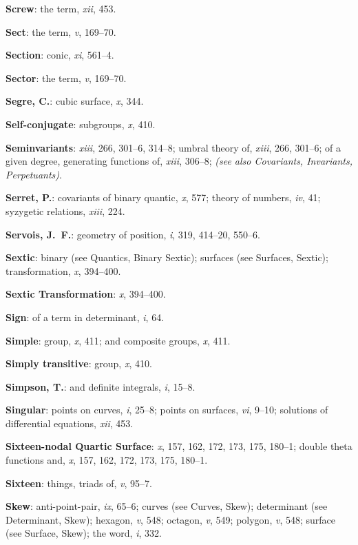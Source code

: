 \documentclass[11pt,a4paper]{article}
\newcommand{\IndexEntry}[1]{\textbf{#1}}
\newcommand{\SeeAlso}[1]{\textit{(see also #1)}}
\newcommand{\V}[1]{\textit{#1}} %
\begin{document}
\IndexEntry{Screw}: the term, \V{xii}, 453.

\IndexEntry{Sect}: the term, \V{v}, 169--70.

\IndexEntry{Section}: conic, \V{xi}, 561--4.

\IndexEntry{Sector}: the term, \V{v}, 169--70.

\IndexEntry{Segre, C.}: cubic surface, \V{x}, 344.

\IndexEntry{Self-conjugate}: subgroups, \V{x}, 410.

\IndexEntry{Seminvariants}: \V{xiii}, 266, 301--6, 314--8; umbral theory of, \V{xiii}, 266, 301--6; of a given degree, generating functions of, \V{xiii}, 306--8; \SeeAlso{Covariants, Invariants, Perpetuants}.

\IndexEntry{Serret, P.}: covariants of binary quantic, \V{x}, 577; theory of numbers, \V{iv}, 41; syzygetic relations, \V{xiii}, 224.

\IndexEntry{Servois, J.\ F.}: geometry of position, \V{i}, 319, 414--20, 550--6.

\IndexEntry{Sextic}: binary (see Quantics, Binary Sextic); surfaces (see Surfaces, Sextic); transformation, \V{x}, 394--400.

\newpage

\setcounter{page}{123}

\IndexEntry{Sextic Transformation}: \V{x}, 394--400.

\IndexEntry{Sign}: of a term in determinant, \V{i}, 64.

\IndexEntry{Simple}: group, \V{x}, 411; and composite groups, \V{x}, 411.

\IndexEntry{Simply transitive}: group, \V{x}, 410.

\IndexEntry{Simpson, T.}: and definite integrals, \V{i}, 15--8.

\IndexEntry{Singular}: points on curves, \V{i}, 25--8; points on surfaces, \V{vi}, 9--10; solutions of differential equations, \V{xii}, 453.

\IndexEntry{Sixteen-nodal Quartic Surface}: \V{x}, 157, 162, 172, 173, 175, 180--1; double theta functions and, \V{x}, 157, 162, 172, 173, 175, 180--1.

\IndexEntry{Sixteen}: things, triads of, \V{v}, 95--7.

\IndexEntry{Skew}: anti-point-pair, \V{ix}, 65--6; curves (see Curves, Skew); determinant (see Determinant, Skew); hexagon, \V{v}, 548; octagon, \V{v}, 549; polygon, \V{v}, 548; surface (see Surface, Skew); the word, \V{i}, 332.
\end{document}

